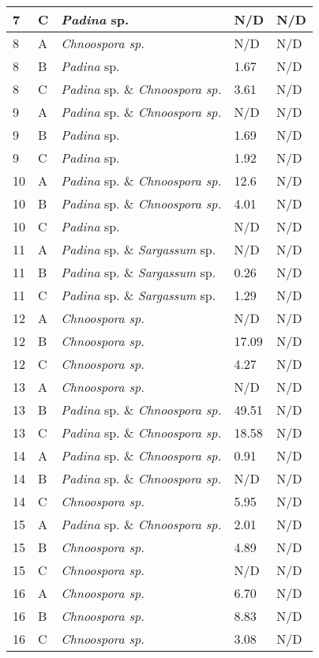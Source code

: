 \documentclass[12pt]{article}
\begin{document}
\begin{longtable}{ | p{1cm} | p{1cm} | p{3cm} | p{4cm} | p{4cm} | }
\hline
7&C&\emph{Padina} sp.&N/D&N/D\\
\hline
8&A&\emph{Chnoospora sp.}&N/D&N/D\\
\hline
8&B&\emph{Padina} sp.&1.67
&N/D\\
\hline
8&C&\emph{Padina} sp. \& \emph{Chnoospora sp.}&3.61
&N/D\\
\hline
9&A&\emph{Padina} sp. \& \emph{Chnoospora sp.}&N/D&N/D\\
\hline
9&B&\emph{Padina} sp.&1.69
&N/D\\
\hline
9&C&\emph{Padina} sp.&1.92
&N/D\\
\hline
10&A&\emph{Padina} sp. \& \emph{Chnoospora sp.}&12.6
&N/D\\
\hline
10&B&\emph{Padina} sp. \& \emph{Chnoospora sp.}&4.01
&N/D\\
\hline
10&C&\emph{Padina} sp.&N/D&N/D\\
\hline
11&A&\emph{Padina} sp. \& \emph{Sargassum} sp.&N/D&N/D\\
\hline
11&B&\emph{Padina} sp. \& \emph{Sargassum} sp.&0.26
&N/D\\
\hline
11&C&\emph{Padina} sp. \& \emph{Sargassum} sp.&1.29
&N/D\\
\hline
12&A&\emph{Chnoospora sp.}&N/D&N/D\\
\hline
12&B&\emph{Chnoospora sp.}&17.09
&N/D\\
\hline
12&C&\emph{Chnoospora sp.}&4.27
&N/D\\
\hline
13&A&\emph{Chnoospora sp.}&N/D&N/D\\
\hline
13&B&\emph{Padina} sp. \& \emph{Chnoospora sp.}&49.51
&N/D\\
\hline
13&C&\emph{Padina} sp. \& \emph{Chnoospora sp.}&18.58
&N/D\\
\hline
14&A&\emph{Padina} sp. \& \emph{Chnoospora sp.}&0.91
&N/D\\
\hline
14&B&\emph{Padina} sp. \& \emph{Chnoospora sp.}&N/D&N/D\\
\hline
14&C&\emph{Chnoospora sp.}&5.95
&N/D\\
\hline
15&A&\emph{Padina} sp. \& \emph{Chnoospora sp.}&2.01
&N/D\\
\hline
15&B&\emph{Chnoospora sp.}&4.89
&N/D\\
\hline
15&C&\emph{Chnoospora sp.}&N/D&N/D\\
\hline
16&A&\emph{Chnoospora sp.}&6.70&N/D\\
\hline
16&B&\emph{Chnoospora sp.}&8.83
&N/D\\
\hline
16&C&\emph{Chnoospora sp.}&3.08
&N/D\\

\end{longtable}
\end{document}
